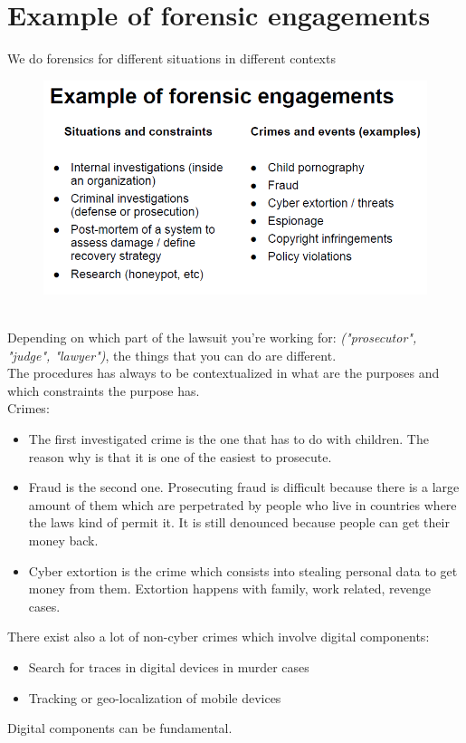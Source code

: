 \section{Example of forensic engagements}
    We do forensics for different situations in different contexts
    \begin{figure}[ht!]
        \centering
        \includegraphics[width=0.5\linewidth]{lecture_3/forensics.png}
    \end{figure}
    \\Depending on which part of the lawsuit you're working for: \textit{("prosecutor", "judge", "lawyer")}, the things that you can do are different.\\
    The procedures has always to be contextualized in what are the purposes and which constraints the purpose has. \\
    \vspace{5mm}         
    Crimes:
        \begin{itemize}
            \item The first investigated crime is the one that has to do with children. The reason why is that it is one of the easiest to prosecute.
            \item Fraud is the second one. Prosecuting fraud is difficult because there is a large amount of them which are perpetrated by people who live in countries where the laws kind of permit it. It is still denounced because people can get their money back.
            \item Cyber extortion is the crime which consists into stealing personal data to get money from them. Extortion happens with family, work related, revenge cases.
        \end{itemize}
    There exist also a lot of non-cyber crimes which involve digital components:
        \begin{itemize}
            \item Search for traces in digital devices in murder cases
            \item Tracking or geo-localization of mobile devices
        \end{itemize}
    Digital components can be fundamental.
